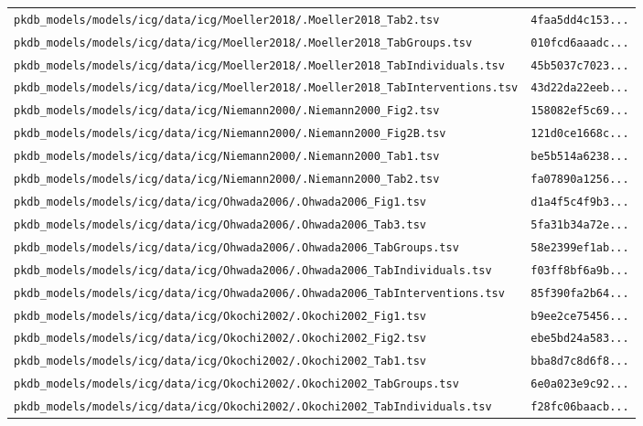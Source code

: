 \begin{longtable}{ll}
\texttt{pkdb\_models/models/icg/data/icg/Moeller2018/.Moeller2018\_Tab2.tsv} & \texttt{4faa5dd4c153...} \\
\texttt{pkdb\_models/models/icg/data/icg/Moeller2018/.Moeller2018\_TabGroups.tsv} & \texttt{010fcd6aaadc...} \\
\texttt{pkdb\_models/models/icg/data/icg/Moeller2018/.Moeller2018\_TabIndividuals.tsv} & \texttt{45b5037c7023...} \\
\texttt{pkdb\_models/models/icg/data/icg/Moeller2018/.Moeller2018\_TabInterventions.tsv} & \texttt{43d22da22eeb...} \\
\texttt{pkdb\_models/models/icg/data/icg/Niemann2000/.Niemann2000\_Fig2.tsv} & \texttt{158082ef5c69...} \\
\texttt{pkdb\_models/models/icg/data/icg/Niemann2000/.Niemann2000\_Fig2B.tsv} & \texttt{121d0ce1668c...} \\
\texttt{pkdb\_models/models/icg/data/icg/Niemann2000/.Niemann2000\_Tab1.tsv} & \texttt{be5b514a6238...} \\
\texttt{pkdb\_models/models/icg/data/icg/Niemann2000/.Niemann2000\_Tab2.tsv} & \texttt{fa07890a1256...} \\
\texttt{pkdb\_models/models/icg/data/icg/Ohwada2006/.Ohwada2006\_Fig1.tsv} & \texttt{d1a4f5c4f9b3...} \\
\texttt{pkdb\_models/models/icg/data/icg/Ohwada2006/.Ohwada2006\_Tab3.tsv} & \texttt{5fa31b34a72e...} \\
\texttt{pkdb\_models/models/icg/data/icg/Ohwada2006/.Ohwada2006\_TabGroups.tsv} & \texttt{58e2399ef1ab...} \\
\texttt{pkdb\_models/models/icg/data/icg/Ohwada2006/.Ohwada2006\_TabIndividuals.tsv} & \texttt{f03ff8bf6a9b...} \\
\texttt{pkdb\_models/models/icg/data/icg/Ohwada2006/.Ohwada2006\_TabInterventions.tsv} & \texttt{85f390fa2b64...} \\
\texttt{pkdb\_models/models/icg/data/icg/Okochi2002/.Okochi2002\_Fig1.tsv} & \texttt{b9ee2ce75456...} \\
\texttt{pkdb\_models/models/icg/data/icg/Okochi2002/.Okochi2002\_Fig2.tsv} & \texttt{ebe5bd24a583...} \\
\texttt{pkdb\_models/models/icg/data/icg/Okochi2002/.Okochi2002\_Tab1.tsv} & \texttt{bba8d7c8d6f8...} \\
\texttt{pkdb\_models/models/icg/data/icg/Okochi2002/.Okochi2002\_TabGroups.tsv} & \texttt{6e0a023e9c92...} \\
\texttt{pkdb\_models/models/icg/data/icg/Okochi2002/.Okochi2002\_TabIndividuals.tsv} & \texttt{f28fc06baacb...} \\

\end{longtable}
